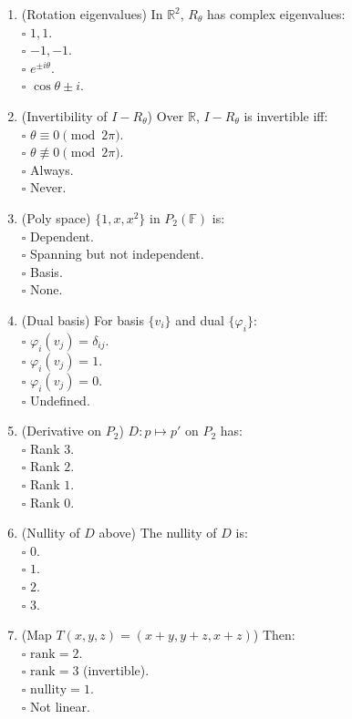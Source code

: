 \documentclass[11pt]{article}
\theoremstyle{upright}
\begin{document}
\begin{enumerate}
\item (Rotation eigenvalues) In $\mathbb{R}^2$, $R_\theta$ has complex eigenvalues:\\
\(\square\) $1,1$.\\
\(\square\) $-1,-1$.\\
\(\square\) $e^{\pm i\theta}$.\\
\(\square\) $\cos\theta\pm i$.

\item (Invertibility of $I-R_\theta$) Over $\mathbb{R}$, $I-R_\theta$ is invertible iff:\\
\(\square\) $\theta\equiv 0\pmod{2\pi}$.\\
\(\square\) $\theta\not\equiv 0\pmod{2\pi}$.\\
\(\square\) Always.\\
\(\square\) Never.

\item (Poly space) $\{1,x,x^2\}$ in $P_2(\mathbb{F})$ is:\\
\(\square\) Dependent.\\
\(\square\) Spanning but not independent.\\
\(\square\) Basis.\\
\(\square\) None.

\item (Dual basis) For basis $\{v_i\}$ and dual $\{\varphi_i\}$:\\
\(\square\) $\varphi_i(v_j)=\delta_{ij}$.\\
\(\square\) $\varphi_i(v_j)=1$.\\
\(\square\) $\varphi_i(v_j)=0$.\\
\(\square\) Undefined.

\item (Derivative on $P_2$) $D:p\mapsto p'$ on $P_2$ has:\\
\(\square\) Rank $3$.\\
\(\square\) Rank $2$.\\
\(\square\) Rank $1$.\\
\(\square\) Rank $0$.

\item (Nullity of $D$ above) The nullity of $D$ is:\\
\(\square\) $0$.\\
\(\square\) $1$.\\
\(\square\) $2$.\\
\(\square\) $3$.

\item (Map $T(x,y,z)=(x+y,y+z,x+z)$) Then:\\
\(\square\) $\mathrm{rank}=2$.\\
\(\square\) $\mathrm{rank}=3$ (invertible).\\
\(\square\) $\mathrm{nullity}=1$.\\
\(\square\) Not linear.


\end{enumerate}
\end{document}
